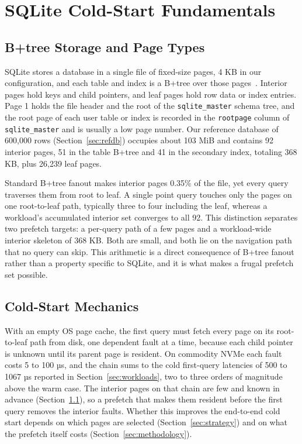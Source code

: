 \documentclass[sigconf, nonacm]{acmart}
\begin{document}
\section{SQLite Cold-Start Fundamentals}\label{sec:fundamentals}

\subsection{B+tree Storage and Page Types}\label{sec:btree}

SQLite stores a database in a single file of fixed-size pages, 4 KB in our configuration, and each table and index is a B+tree over those pages~\cite{Gaffney2022}. Interior pages hold keys and child pointers, and leaf pages hold row data or index entries. Page 1 holds the file header and the root of the \texttt{sqlite\_master} schema tree, and the root page of each user table or index is recorded in the \texttt{rootpage} column of \texttt{sqlite\_master} and is usually a low page number. Our reference database of 600,000 rows (Section~\ref{sec:refdb}) occupies about 103 MiB and contains 92 interior pages, 51 in the table B+tree and 41 in the secondary index, totaling 368 KB, plus 26,239 leaf pages.

Standard B+tree fanout makes interior pages 0.35\% of the file, yet every query traverses them from root to leaf. A single point query touches only the pages on one root-to-leaf path, typically three to four including the leaf, whereas a workload's accumulated interior set converges to all 92. This distinction separates two prefetch targets: a per-query path of a few pages and a workload-wide interior skeleton of 368 KB. Both are small, and both lie on the navigation path that no query can skip. This arithmetic is a direct consequence of B+tree fanout rather than a property specific to SQLite, and it is what makes a frugal prefetch set possible.

\subsection{Cold-Start Mechanics}\label{sec:coldstart-mechanics}

With an empty OS page cache, the first query must fetch every page on its root-to-leaf path from disk, one dependent fault at a time, because each child pointer is unknown until its parent page is resident. On commodity NVMe each fault costs 5 to 100 µs, and the chain sums to the cold first-query latencies of 500 to 1067 µs reported in Section~\ref{sec:workloads}, two to three orders of magnitude above the warm case. The interior pages on that chain are few and known in advance (Section~\ref{sec:btree}), so a prefetch that makes them resident before the first query removes the interior faults. Whether this improves the end-to-end cold start depends on which pages are selected (Section~\ref{sec:strategy}) and on what the prefetch itself costs (Section~\ref{sec:methodology}).
\end{document}
